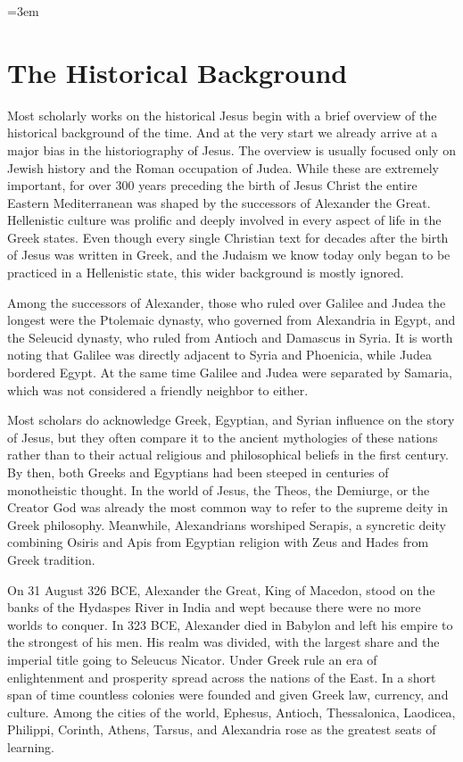 \hfuzz=5pt %
\emergencystretch=3em %

\section{The Historical Background}\label{par:background-historical}

Most scholarly works on the historical Jesus begin with a brief overview of the historical background of the time.
And at the very start we already arrive at a major bias in the historiography of Jesus.
The overview is usually focused only on Jewish history and the Roman occupation of Judea.
While these are extremely important, for over 300 years preceding the birth of Jesus Christ the entire Eastern Mediterranean was shaped by the successors of Alexander the Great.
Hellenistic culture was prolific and deeply involved in every aspect of life in the Greek states.
Even though every single Christian text for decades after the birth of Jesus was written in Greek, and the Judaism we know today only began to be practiced in a Hellenistic state, this wider background is mostly ignored.

Among the successors of Alexander, those who ruled over Galilee and Judea the longest were the Ptolemaic dynasty, who governed from Alexandria in Egypt, and the Seleucid dynasty, who ruled from Antioch and Damascus in Syria.
It is worth noting that Galilee was directly adjacent to Syria and Phoenicia, while Judea bordered Egypt.
At the same time Galilee and Judea were separated by Samaria, which was not considered a friendly neighbor to either.

Most scholars do acknowledge Greek, Egyptian, and Syrian influence on the story of Jesus, but they often compare it to the ancient mythologies of these nations rather than to their actual religious and philosophical beliefs in the first century.
By then, both Greeks and Egyptians had been steeped in centuries of monotheistic thought.
In the world of Jesus, the Theos, the Demiurge, or the Creator God was already the most common way to refer to the supreme deity in Greek philosophy.
Meanwhile, Alexandrians worshiped Serapis, a syncretic deity combining Osiris and Apis from Egyptian religion with Zeus and Hades from Greek tradition.

On 31 August 326 BCE, Alexander the Great, King of Macedon, stood on the banks of the Hydaspes River in India and wept because there were no more worlds to conquer.
In 323 BCE, Alexander died in Babylon and left his empire to the strongest of his men.
His realm was divided, with the largest share and the imperial title going to Seleucus Nicator.
Under Greek rule an era of enlightenment and prosperity spread across the nations of the East.
In a short span of time countless colonies were founded and given Greek law, currency, and culture.
Among the cities of the world, Ephesus, Antioch, Thessalonica, Laodicea, Philippi, Corinth, Athens, Tarsus, and Alexandria rose as the greatest seats of learning.

